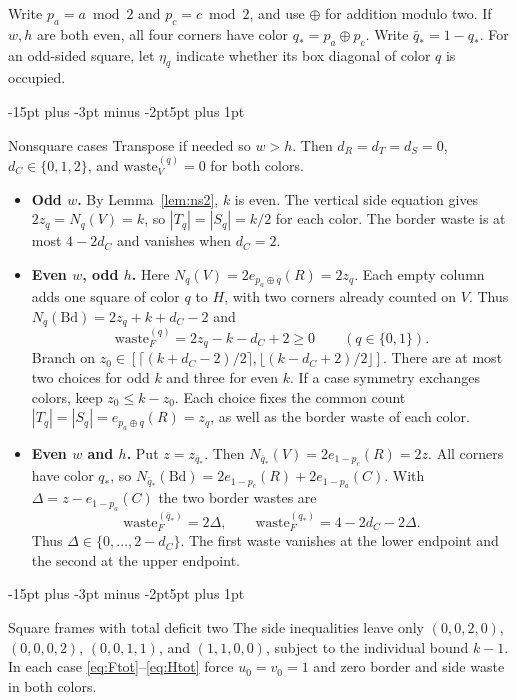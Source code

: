 \documentclass[11pt,a4paper]{article}
\makeatletter
\renewcommand{\subsection}{\@startsection{subsection}{2}{\z@}%
  {-15pt plus -3pt minus -2pt}{5pt plus 1pt}%
  {\normalfont\bfseries\raggedright}}
\theoremstyle{result}
\theoremstyle{definition}
\theoremstyle{remark}
\newcommand{\waste}{\mathrm{waste}}
\newcommand{\Bd}{\mathrm{Bd}}
\makeatother
\begin{document}
Write $p_a=a\bmod 2$ and $p_c=c\bmod 2$, and use $\oplus$ for
addition modulo two. If $w,h$ are both even, all four corners
have color $q_*=p_a\oplus p_c$. Write $\bar q_*=1-q_*$.
For an odd-sided square, let $\eta_q$ indicate whether its box
diagonal of color $q$ is occupied.

\subsection{Nonsquare cases}
Transpose if needed so $w>h$. Then $d_R=d_T=d_S=0$,
$d_C\in\{0,1,2\}$, and $\waste_V^{(q)}=0$ for both colors.
\begin{itemize}[leftmargin=1.8em,itemsep=3pt]
  \item \textbf{Odd $w$.} By Lemma~\ref{lem:ns2}, $k$ is even.
    The vertical side equation gives $2z_q=N_q(V)=k$,
    so $|T_q|=|S_q|=k/2$ for each color. The border waste
    is at most $4-2d_C$ and vanishes when $d_C=2$.
  \item \textbf{Even $w$, odd $h$.}
    Here $N_q(V)=2e_{p_a\oplus q}(R)=2z_q$. Each empty column
    adds one square of color $q$ to $H$, with two corners already
    counted on $V$. Thus $N_q(\Bd)=2z_q+k+d_C-2$ and
  \[
    \waste_F^{(q)} = 2 z_q - k - d_C + 2 \ge 0 \qquad (q \in \{0,1\}).
  \]
    Branch on
    $z_0\in[\lceil(k+d_C-2)/2\rceil,\lfloor(k-d_C+2)/2\rfloor]$.
    There are at most two choices for odd $k$ and three for even
    $k$. If a case symmetry exchanges colors, keep $z_0\le k-z_0$.
    Each choice fixes the common count $|T_q|=|S_q|=e_{p_a\oplus q}(R)=z_q$,
    as well as the border waste of each color.
  \item \textbf{Even $w$ and $h$.}
    Put $z=z_{\bar q_*}$. Then $N_{\bar q_*}(V)=2e_{1-p_c}(R)=2z$.
    All corners have color $q_*$, so
    $N_{\bar q_*}(\Bd)=2e_{1-p_c}(R)+2e_{1-p_a}(C)$. With
    $\Delta=z-e_{1-p_a}(C)$ the two border wastes are
    \[
      \waste_F^{(\bar q_*)}=2\Delta,\qquad
      \waste_F^{(q_*)}=4-2d_C-2\Delta.
    \]
    Thus $\Delta\in\{0,\ldots,2-d_C\}$. The first waste vanishes
    at the lower endpoint and the second at the upper endpoint.
\end{itemize}

\subsection{Square frames with total deficit two}
The side inequalities leave only $(0,0,2,0)$, $(0,0,0,2)$,
$(0,0,1,1)$, and $(1,1,0,0)$, subject to the individual bound $k-1$.
In each case \eqref{eq:Ftot}--\eqref{eq:Htot} force
$u_0=v_0=1$ and zero border and side waste in both colors.
\end{document}
